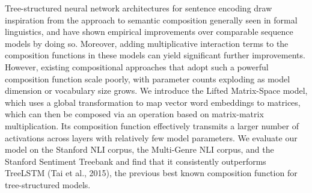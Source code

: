 Tree-structured neural network architectures for sentence encoding draw inspiration from the approach to semantic composition generally seen in formal linguistics, and have shown empirical improvements over comparable sequence models by doing so. Moreover, adding multiplicative interaction terms to the  composition functions in these models can yield significant further improvements. However, existing compositional approaches that adopt such a powerful composition function scale poorly, with parameter counts exploding as model dimension or vocabulary size grows. We introduce the Lifted Matrix-Space model, which uses a global transformation to map vector word embeddings to matrices, which can then be composed via an operation based on matrix-matrix multiplication. Its composition function effectively transmits a larger number of activations across layers with relatively few model parameters. We evaluate our model on the Stanford NLI corpus, the Multi-Genre NLI corpus, and the Stanford Sentiment Treebank and find that it consistently outperforms TreeLSTM (Tai et al., 2015), the previous best known composition function for tree-structured models.

